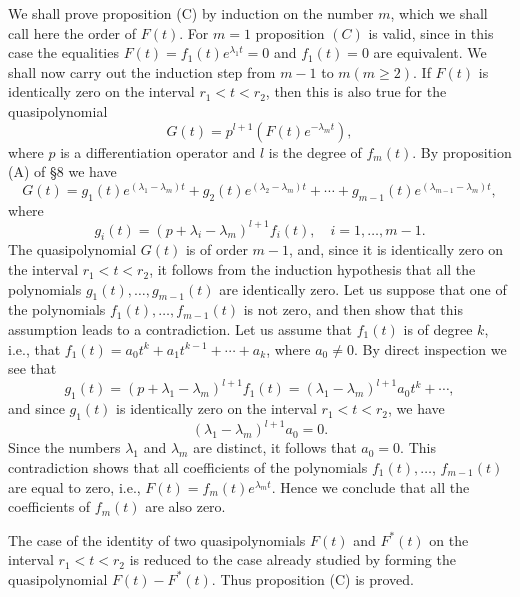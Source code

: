 \documentclass[10pt,a5paper]{book}
\theoremstyle{plain}
\theoremstyle{definition}
\theoremstyle{remark}
\begin{document}
We shall prove proposition (C) by induction on the number $m$, which we shall call here the order of $F(t)$. For $m=1$ proposition $(C)$ is valid, since in this case the equalities $F(t)=f_{1}(t) e^{\lambda_{1} t}=0$ and $f_{1}(t)=0$ are equivalent. We shall now carry out the induction step from $m-1$ to $m(m \geq 2)$. If $F(t)$ is identically zero on the interval $r_{1}<t<r_{2}$, then this is also true for the quasipolynomial
\[
G(t)=p^{l+1}\left(F(t) e^{-\lambda_{m} t}\right),
\]
where $p$ is a differentiation operator and $l$ is the degree of $f_{m}(t)$. By proposition (A) of §8 we have
\[
G(t)=g_{1}(t) e^{\left(\lambda_{1}-\lambda_{m}\right) t}+g_{2}(t) e^{\left(\lambda_{2}-\lambda_{m}\right) t}+\cdots+g_{m-1}(t) e^{\left(\lambda_{m-1}-\lambda_{m}\right) t},
\]
where
\[
g_{i}(t)=\left(p+\lambda_{i}-\lambda_{m}\right)^{l+1} f_{i}(t), \quad i=1, \ldots, m-1 .
\]
The quasipolynomial $G(t)$ is of order $m-1$, and, since it is identically zero on the interval $r_{1}<t<r_{2}$, it follows from the induction hypothesis that all the polynomials $g_{1}(t), \ldots, g_{m-1}(t)$ are identically zero. Let us suppose that one of the polynomials $f_{1}(t), \ldots, f_{m-1}(t)$ is not zero, and then show that this assumption leads to a contradiction. Let us assume that $f_{1}(t)$ is of degree $k$, i.e., that $f_{1}(t)=a_{0} t^{k}+a_{1} t^{k-1}+\cdots+a_{k}$,
where $a_{0} \neq 0$. By direct inspection we see that
\[
g_{1}(t)=\left(p+\lambda_{1}-\lambda_{m}\right)^{l+1} f_{1}(t)=\left(\lambda_{1}-\lambda_{m}\right)^{l+1} a_{0} t^{k}+\cdots,
\]
and since $g_{1}(t)$ is identically zero on the interval $r_{1}<t<r_{2}$, we have
\[
\left(\lambda_{1}-\lambda_{m}\right)^{l+1} a_{0}=0 .
\]
Since the numbers $\lambda_{1}$ and $\lambda_{m}$ are distinct, it follows that $a_{0}=0$. This contradiction shows that all coefficients of the polynomials $f_{1}(t), \ldots$, $f_{m-1}(t)$ are equal to zero, i.e., $F(t)=f_{m}(t) e^{\lambda_{m} t}$. Hence we conclude that all the coefficients of $f_{m}(t)$ are also zero.

The case of the identity of two quasipolynomials $F(t)$ and $F^{*}(t)$ on the interval $r_{1}<t<r_{2}$ is reduced to the case already studied by forming the quasipolynomial $F(t)-F^{*}(t)$. Thus proposition (C) is proved.
\end{document}
